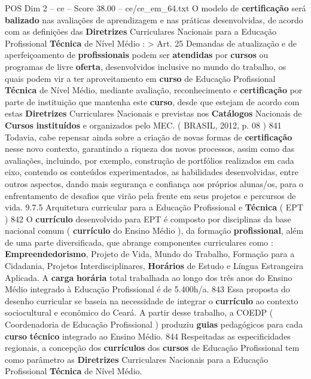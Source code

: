 \begin{textsample}{POS Dim 2 – ce – Score 38.00 – ce/ce\_em\_64.txt}
O modelo de \textbf{certificação} será \textbf{balizado} nas avaliações de aprendizagem e nas práticas desenvolvidas, de acordo com as definições das \textbf{Diretrizes} Curriculares Nacionais para a Educação Profissional \textbf{Técnica} de Nível Médio : > Art. 25 Demandas de atualização e de aperfeiçoamento de \textbf{profissionais} podem ser \textbf{atendidas} por \textbf{cursos} ou programas de livre \textbf{oferta}, desenvolvidos inclusive no mundo do trabalho, os quais podem vir a ter aproveitamento em \textbf{curso} de Educação Profissional \textbf{Técnica} de Nível Médio, mediante avaliação, reconhecimento e \textbf{certificação} por parte de instituição que mantenha este \textbf{curso}, desde que estejam de acordo com estas \textbf{Diretrizes} Curriculares Nacionais e previstas nos \textbf{Catálogos} Nacionais de \textbf{Cursos} \textbf{instituídos} e organizados pelo MEC. ( BRASIL, 2012, p. 08 ) 841 Todavia, cabe repensar ainda sobre a criação de novas formas de \textbf{certificação} nesse novo contexto, garantindo a riqueza dos novos processos, assim como das avaliações, incluindo, por exemplo, construção de portfólios realizados em cada eixo, contendo os conteúdos experimentados, as habilidades desenvolvidas, entre outros aspectos, dando mais segurança e confiança aos próprios alunas/os, para o enfrentamento de desafios que virão pela frente em seus projetos e percursos de vida. 9.7.5 Arquitetura curricular para a Educação Profissional e \textbf{Técnica} ( EPT ) 842 O \textbf{currículo} desenvolvido para EPT é composto por disciplinas da base nacional comum ( \textbf{currículo} do Ensino Médio ), da formação \textbf{profissional}, além de uma parte diversificada, que abrange componentes curriculares como : \textbf{Empreendedorismo}, Projeto de Vida, Mundo do Trabalho, Formação para a Cidadania, Projetos Interdisciplinares, \textbf{Horários} de Estudo e Língua Estrangeira Aplicada.
A \textbf{carga} \textbf{horária} total trabalhada ao longo dos três anos do Ensino Médio integrado à Educação Profissional é de 5.400h/a. 843 Essa proposta do desenho curricular se baseia na necessidade de integrar o \textbf{currículo} ao contexto sociocultural e econômico do Ceará.
A partir desse trabalho, a COEDP ( Coordenadoria de Educação Profissional ) produziu \textbf{guias} pedagógicos para cada \textbf{curso} \textbf{técnico} integrado ao Ensino Médio. 844 Respeitadas as especificidades regionais, a concepção dos \textbf{currículos} dos \textbf{cursos} de Educação Profissional tem como parâmetro as \textbf{Diretrizes} Curriculares Nacionais para a Educação Profissional \textbf{Técnica} de Nível Médio.

\end{textsample}
